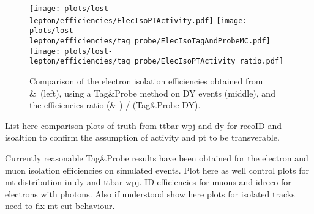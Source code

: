 \begin{figure}[h]
  \centering
  \texttt{[image: plots/lost-lepton/efficiencies/ElecIsoPTActivity.pdf]}
  \texttt{[image: plots/lost-lepton/efficiencies/tag\_probe/ElecIsoTagAndProbeMC.pdf]}\\
  \texttt{[image: plots/lost-lepton/efficiencies/tag\_probe/ElecIsoPTActivity\_ratio.pdf]}
  \caption{Comparison of the electron isolation efficiencies obtained from \ttbar &\ \wpj (left), using a Tag\&Probe method on DY events (middle), and the efficiencies ratio (\ttbar \& \wpj) / (Tag\&Probe DY).}
  \label{fig:lost-lepton-tag_probe-elec-iso}
\end{figure}
List here comparison plots of truth from ttbar wpj and dy for recoID and isoaltion to confirm the assumption of activity and pt to be transverable.

Currently reasonable Tag\&Probe results have been obtained for the electron and muon isolation efficiencies on simulated events.
Plot here as well control plots for mt distribution in dy and ttbar wpj. ID efficiencies for muons and idreco for electrons with photons.
Also if understood show here plots for isolated tracks need to fix mt cut behaviour.


\clearpage